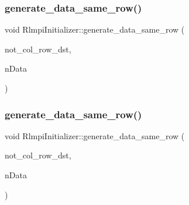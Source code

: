\subsubsection{\texorpdfstring{generate\_data\_same\_row()}{generate\_data\_same\_row()}\hspace{0.1cm}{\footnotesize\ttfamily [3/4]}}
{\footnotesize\ttfamily void Rlmpi\+Initializer\+::generate\+\_\+data\+\_\+same\+\_\+row (\begin{DoxyParamCaption}\item[{const vector$<$ vector$<$ \mbox{\hyperlink{include_2RlmpiShared_8h_a69782ffde89d45e86308f10afedf08a6}{int8\+L\+DM}} $>$ $>$ \&}]{not\+\_\+col\+\_\+row\+\_\+dst,  }\item[{const vector$<$ vector$<$ \mbox{\hyperlink{include_2RlmpiShared_8h_a69782ffde89d45e86308f10afedf08a6}{int8\+L\+DM}} $>$ $>$ \&}]{n\+Data }\end{DoxyParamCaption})\hspace{0.3cm}{\ttfamily [protected]}}

\mbox{\label{classRlmpiInitializer_aad9919df0a82470522b25994dedeaf4e}} 
\subsubsection{\texorpdfstring{generate\_data\_same\_row()}{generate\_data\_same\_row()}\hspace{0.1cm}{\footnotesize\ttfamily [4/4]}}
{\footnotesize\ttfamily void Rlmpi\+Initializer\+::generate\+\_\+data\+\_\+same\+\_\+row (\begin{DoxyParamCaption}\item[{const vector$<$ vector$<$ \mbox{\hyperlink{include_2RlmpiShared_8h_a69782ffde89d45e86308f10afedf08a6}{int8\+L\+DM}} $>$ $>$ \&}]{not\+\_\+col\+\_\+row\+\_\+dst,  }\item[{const vector$<$ vector$<$ \mbox{\hyperlink{include_2RlmpiShared_8h_a69782ffde89d45e86308f10afedf08a6}{int8\+L\+DM}} $>$ $>$ \&}]{n\+Data }\end{DoxyParamCaption})\hspace{0.3cm}{\ttfamily [protected]}}

\mbox{\label{classRlmpiInitializer_a538c284d2e67fbbdcbeb4e05aaaa546a}} 
